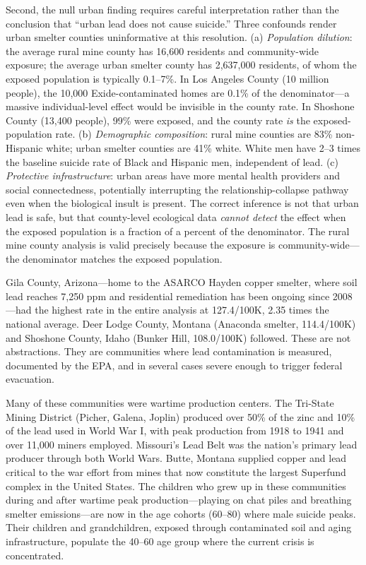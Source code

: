 \documentclass[11pt,twocolumn]{article}
\begin{document}
Second, the null urban finding requires careful interpretation rather than the conclusion that ``urban lead does not cause suicide.'' Three confounds render urban smelter counties uninformative at this resolution. (a) \textit{Population dilution}: the average rural mine county has 16,600 residents and community-wide exposure; the average urban smelter county has 2,637,000 residents, of whom the exposed population is typically 0.1--7\%. In Los Angeles County (10 million people), the 10,000 Exide-contaminated homes are 0.1\% of the denominator---a massive individual-level effect would be invisible in the county rate. In Shoshone County (13,400 people), 99\% were exposed, and the county rate \textit{is} the exposed-population rate. (b) \textit{Demographic composition}: rural mine counties are 83\% non-Hispanic white; urban smelter counties are 41\% white. White men have 2--3 times the baseline suicide rate of Black and Hispanic men, independent of lead. (c) \textit{Protective infrastructure}: urban areas have more mental health providers and social connectedness, potentially interrupting the relationship-collapse pathway even when the biological insult is present. The correct inference is not that urban lead is safe, but that county-level ecological data \textit{cannot detect} the effect when the exposed population is a fraction of a percent of the denominator. The rural mine county analysis is valid precisely because the exposure is community-wide---the denominator matches the exposed population.

Gila County, Arizona---home to the ASARCO Hayden copper smelter, where soil lead reaches 7,250 ppm and residential remediation has been ongoing since 2008---had the highest rate in the entire analysis at 127.4/100K, 2.35 times the national average. Deer Lodge County, Montana (Anaconda smelter, 114.4/100K) and Shoshone County, Idaho (Bunker Hill, 108.0/100K) followed. These are not abstractions. They are communities where lead contamination is measured, documented by the EPA, and in several cases severe enough to trigger federal evacuation.

Many of these communities were wartime production centers. The Tri-State Mining District (Picher, Galena, Joplin) produced over 50\% of the zinc and 10\% of the lead used in World War I, with peak production from 1918 to 1941 and over 11,000 miners employed. Missouri's Lead Belt was the nation's primary lead producer through both World Wars. Butte, Montana supplied copper and lead critical to the war effort from mines that now constitute the largest Superfund complex in the United States. The children who grew up in these communities during and after wartime peak production---playing on chat piles and breathing smelter emissions---are now in the age cohorts (60--80) where male suicide peaks. Their children and grandchildren, exposed through contaminated soil and aging infrastructure, populate the 40--60 age group where the current crisis is concentrated.
\end{document}
